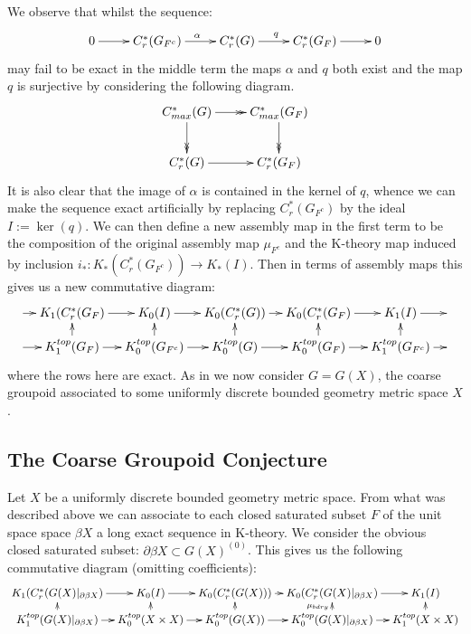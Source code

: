 \documentclass[11pt]{amsart}
\theoremstyle{plain}
\theoremstyle{definition}%
\theoremstyle{remark}%
\begin{document}
We observe that whilst the sequence:
\begin{equation*}
\xymatrix{
0 \ar[r] & C_{r}^{*}(G_{F^{c}}) \ar[r]^{\alpha}& C_{r}^{*}(G) \ar[r]^{q} & C_{r}^{*}(G_{F}) \ar[r] & 0
}
\end{equation*}
may fail to be exact in the middle term the maps $\alpha$ and $q$ both exist and the map $q$ is surjective by considering the following diagram.
\begin{equation*}
\xymatrix{C^{*}_{max}(G) \ar@{->>}[r] \ar@{->>}[d] & C^{*}_{max}(G_{F}) \ar@{->>}[d]\\
C^{*}_{r}(G)\ar@{->}[r] &   C^{*}_{r}(G_{F})
}
\end{equation*}
It is also clear that the image of $\alpha$ is contained in the kernel of $q$, whence we can make the sequence exact artificially by replacing $C_{r}^{*}(G_{F^{c}})$ by the ideal $I:=\ker(q)$. We can then define a new assembly map in the first term to be the composition of the original assembly map $\mu_{F^{c}}$ and the K-theory map induced by inclusion $i_{*}:K_{*}(C^{*}_{r}(G_{F^{c}})) \rightarrow K_{*}(I)$. Then in terms of assembly maps this gives us a new commutative diagram:
\begin{equation*}\label{Fig:F1}
\xymatrix@=1em{
\ar[r] & K_{1}(C^{*}_{r}(G_{F}) \ar[r] & K_{0}(I) \ar[r]& K_{0}(C^{*}_{r}(G)) \ar[r]& K_{0}(C^{*}_{r}(G_{F})\ar[r] & K_{1}(I) \ar[r] & \\
\ar[r] & K_{1}^{top}(G_{F}) \ar[r] \ar[u]& K_{0}^{top}(G_{F^{c}}) \ar[r]\ar[u]& K_{0}^{top}(G) \ar[r]\ar[u]& K_{0}^{top}(G_{F}) \ar[r]\ar[u]& K_{1}^{top}(G_{F^{c}})\ar[u] \ar[r]& 
}
\end{equation*}
where the rows here are exact. 
As in \cite{MR1911663} we now consider $G=G(X)$, the coarse groupoid associated to some uniformly discrete bounded geometry metric space $X$.

\subsection{The Coarse Groupoid Conjecture}
Let $X$ be a uniformly discrete bounded geometry metric space. From what was described above we can associate to each closed saturated subset $F$ of the unit space space $\beta X$ a long exact sequence in K-theory. We consider the obvious closed saturated subset: $\partial \beta X \subset G(X)^{(0)}$. This gives us the following commutative diagram (omitting coefficients):
\begin{equation*}
\xymatrix@=0.7em{
 K_{1}(C^{*}_{r}(G(X)|_{\partial\beta X}) \ar[r] & K_{0}(I) \ar[r]& K_{0}(C^{*}_{r}(G(X))) \ar[r]& K_{0}(C^{*}_{r}(G(X)|_{\partial\beta X})\ar[r] & K_{1}(I)  \\
 K_{1}^{top}(G(X)|_{\partial\beta X}) \ar[r] \ar[u]& K_{0}^{top}(X \times X) \ar[r]\ar[u]& K_{0}^{top}(G(X)) \ar[r]\ar[u]& K_{0}^{top}(G(X)|_{\partial\beta X}) \ar[r]\ar[u]^{\mu_{bdry}}& K_{1}^{top}(X \times X)\ar[u]
}
\end{equation*}
\end{document}
